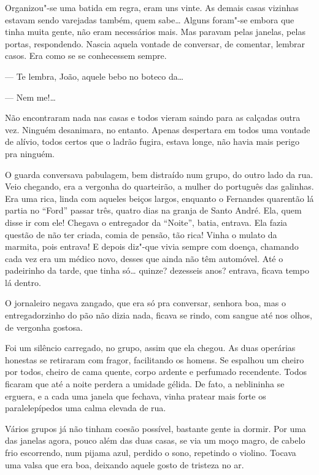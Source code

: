 \begin{linenumbers}
Organizou"-se uma batida em regra, eram uns vinte. As demais casas
vizinhas estavam sendo varejadas também, quem sabe\ldots{} Alguns foram"-se
embora que tinha muita gente, não eram necessários mais. Mas paravam
pelas janelas, pelas portas, respondendo. Nascia aquela vontade de
conversar, de comentar, lembrar casos. Era como se se conhecessem
sempre.

--- Te lembra, João, aquele bebo no boteco da\ldots{}

--- Nem me!\ldots{}

Não encontraram nada nas casas e todos vieram saindo para as calçadas
outra vez. Ninguém desanimara, no entanto. Apenas despertara em todos
uma vontade de alívio, todos certos que o ladrão fugira, estava longe,
não havia mais perigo pra ninguém.

O guarda conversava pabulagem, bem distraído num grupo, do outro lado da
rua. Veio chegando, era a vergonha do quarteirão, a mulher do português
das galinhas. Era uma rica, linda com aqueles beiços largos, enquanto o
Fernandes quarentão lá partia no ``Ford'' passar três, quatro dias na
granja de Santo André. Ela, quem disse ir com ele! Chegava o entregador
da ``Noite'', batia, entrava. Ela fazia questão de não ter criada, comia
de pensão, tão rica! Vinha o mulato da marmita, pois entrava! E depois
diz"-que vivia sempre com doença, chamando cada vez era um médico novo,
desses que ainda não têm automóvel. Até o padeirinho da tarde, que tinha
só\ldots{} quinze? dezesseis anos? entrava, ficava tempo lá dentro.

O jornaleiro negava zangado, que era só pra conversar, senhora boa, mas
o entregadorzinho do pão não dizia nada, ficava se rindo, com sangue até
nos olhos, de vergonha gostosa.

Foi um silêncio carregado, no grupo, assim que ela chegou. As duas
operárias honestas se retiraram com fragor, facilitando os homens. Se
espalhou um cheiro por todos, cheiro de cama quente, corpo ardente e
perfumado recendente. Todos ficaram que até a noite perdera a umidade
gélida. De fato, a neblininha se erguera, e a cada uma janela que
fechava, vinha pratear mais forte os paralelepípedos uma calma elevada
de rua.

Vários grupos já não tinham coesão possível, bastante gente ia dormir.
Por uma das janelas agora, pouco além das duas casas, se via um moço
magro, de cabelo frio escorrendo, num pijama azul, perdido o sono,
repetindo o violino. Tocava uma valsa que era boa, deixando aquele gosto
de tristeza no ar.


\end{linenumbers}
